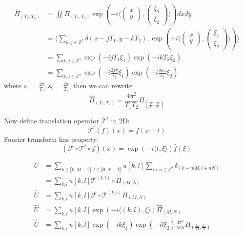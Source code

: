 \documentclass{article}
\begin{document}
	\begin{equation}
	\begin{split}
	\hat{\Pi}_{(T_1,T_2)} &= \iint \Pi_{(T_1,T_2)} \exp(-i \langle \begin{pmatrix}x\\y\end{pmatrix}, \begin{pmatrix}\xi_1\\\xi_2\end{pmatrix} \rangle) dxdy\\
	&= \langle \sum_{k,j\in \mathbb{Z}^2} \delta(x-jT_1,y-kT_2), \exp(-i \langle\begin{pmatrix}x\\y\end{pmatrix}, \begin{pmatrix}\xi_1\\\xi_2\end{pmatrix}\rangle) \rangle\\
	&= \sum_{k,j\in \mathbb{Z}^2} \exp(-ijT_1\xi_1) \exp(-ikT_2\xi_2)\\
	&= \sum_{k,j\in \mathbb{Z}^2} \exp(-i\frac{2j\pi}{s_1}\xi_1) \exp(-i\frac{2k\pi}{s_2}\xi_2)
	\end{split}
	\end{equation}
	where $s_1 = \frac{2\pi}{T_1}, s_2 = \frac{2\pi}{T_2}$, then we can rewrite
	\begin{equation}
	\hat{\Pi}_{(T_1,T_2)} = \frac{4\pi^2}{T_1T_2} \Pi_{(\frac{2\pi}{T_1},\frac{2\pi}{T_2})}
	\end{equation}
	
	Now define translation operator $\mathscr{T}^t$ in 2D:
	\begin{equation}
	\mathscr{T}^t(f)(x) = f(x-t)
	\end{equation}
	Fourier transform has property:
	\begin{equation}
	(\mathscr{F}\circ \mathscr{T}^t \circ f)(x) = \exp(-i\langle t,\xi\rangle) \hat{f}(\xi)
	\end{equation}
	
	\begin{equation}
	\begin{split}
	U &= \sum_{k\in \llbracket 0,M-1\rrbracket, l\in \llbracket 0,N-1\rrbracket } u[k,l] \sum_{m,n\in \mathbb{Z}^2} \delta_{(k+mM,l+nN)}\\
	&= \sum_{k,l } u[k,l] \mathscr{T}^{(k,l)}\circ\Pi_{(M,N)}\\
	\hat{U} &= \sum_{k,l} u[k,l]  \mathscr{F}\circ\mathscr{T}^{(k,l)}\Pi_{(M,N)}\\
	\hat{U} &= \sum_{k,l} u[k,l]  \exp(-i\langle (k,l),\xi\rangle)\hat{\Pi}_{(M,N)}\\
	\hat{U} &= \sum_{k,l} u[k,l]  \exp(-ik\xi_1) \exp(-il\xi_2) \frac{4\pi^2}{MN} \Pi_{(\frac{2\pi}{M},\frac{2\pi}{N})}\\
	\end{split}
	\end{equation}
	
\end{document}
